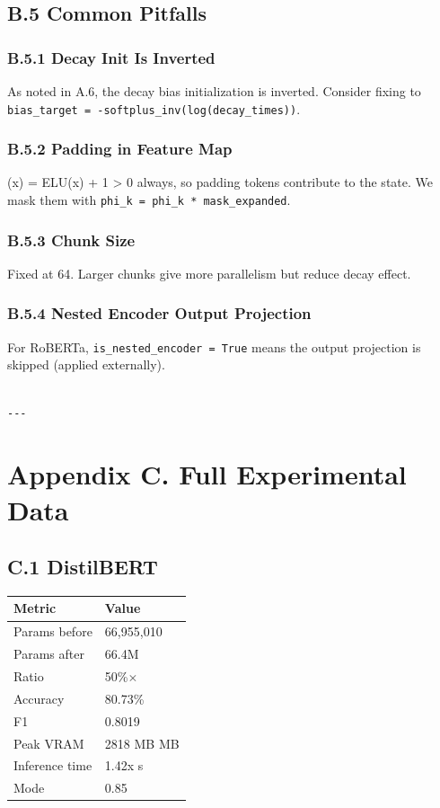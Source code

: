 \subsection{B.5 Common Pitfalls}

\subsubsection{B.5.1 Decay Init Is Inverted}

As noted in A.6, the decay bias initialization is inverted. Consider 
fixing to \texttt{bias\_target = -softplus\_inv(log(decay\_times))}.

\subsubsection{B.5.2 Padding in Feature Map}

 (x) = ELU(x) + 1 > 0 always, so padding tokens contribute to the state. 
We mask them with \texttt{phi\_k = phi\_k * mask\_expanded}.

\subsubsection{B.5.3 Chunk Size}

Fixed at 64. Larger chunks give more parallelism but reduce decay effect.

\subsubsection{B.5.4 Nested Encoder Output Projection}

For RoBERTa, \texttt{is\_nested\_encoder = True} means the output projection is 
skipped (applied externally).
\begin{lstlisting}

---
\end{lstlisting}


\section{Appendix C. Full Experimental Data}

\subsection{C.1 DistilBERT}

\begin{table}[H]
\centering
\small
\begin{tabular}{ll}
\toprule
\textbf{Metric} & \textbf{Value} \\
\midrule
Params before & 66,955,010 \\
Params after & 66.4M \\
Ratio & 50\%$\times$ \\
Accuracy & 80.73\% \\
F1 & 0.8019 \\
Peak VRAM & 2818 MB MB \\
Inference time & 1.42x s \\
Mode & 0.85 \\
\bottomrule
\end{tabular}
\end{table}

